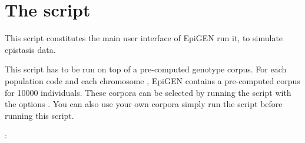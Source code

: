 \documentclass[a4paper,10pt,english]{sphinxhowto}
\begin{document}
\section{The script }
\label{\detokenize{simulate_data:module-simulate_data}}\label{\detokenize{simulate_data:the-script-simulate-data-py}}\label{\detokenize{simulate_data::doc}}
This script constitutes the main user interface of EpiGEN \textendash{} run it, to simulate epistasis data.

This script has to be run on top of a pre-computed genotype corpus. For each population code 
and each chromosome , EpiGEN contains a pre-computed corpus for 10000 individuals. These corpora
can be selected by running the script with the options .
You can also use your own corpora \textendash{} simply run the script  before running this script.

:
\end{document}
